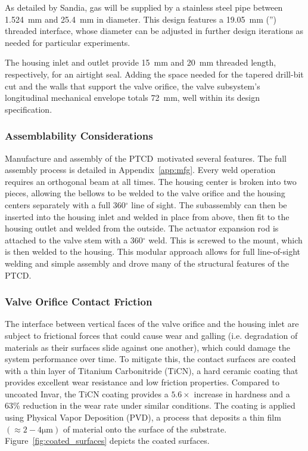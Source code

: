 \documentclass[12pt, letterpaper]{report}%
\newcounter{mycounter}           %
\newcounter{sub}[mycounter]      %
\newcommand{\device}{PTCD}
\begin{document}
				As detailed by Sandia, gas will be supplied by a stainless steel pipe between \SI{1.524}{\milli\meter} and \SI{25.4}{\milli\meter} in diameter.
				This design features a \SI{19.05}{\milli\meter} ('') threaded interface, whose diameter can be adjusted in further design iterations as needed for particular experiments.

				The housing inlet and outlet provide \SI{15}{\milli\meter} and \SI{20}{\milli\meter} threaded length, respectively, for an airtight seal.
				Adding the space needed for the tapered drill-bit cut and the walls that support the valve orifice, the valve subsystem's longitudinal mechanical envelope totals \SI{72}{\milli\meter}, well within its design specification.

				\subsubsection{Assemblability Considerations}
			\label{subsubsec:design:just:gen_dim:assem}

				Manufacture and assembly of the \device\ motivated several features. The full assembly process is detailed in Appendix~\ref{app:mfg}.
				Every weld operation requires an orthogonal beam at all times.
				The housing center is broken into two pieces, allowing the bellows to be welded to the valve orifice and the housing centers separately with a full 360$^\circ$ line of sight.
				The subassembly can then be inserted into the housing inlet and welded in place from above, then fit to the housing outlet and welded from the outside.
				The actuator expansion rod is attached to the valve stem with a 360$^\circ$ weld.
				This is screwed to the mount, which is then welded to the housing.
				This modular approach allows for full line-of-sight welding and simple assembly and drove many of the structural features of the \device.

			\subsubsection{Valve Orifice Contact Friction}
			\label{subsubsec:design:just:gen_dim:friction}

			The interface between vertical faces of the valve orifice and the housing inlet are subject to frictional forces that could cause wear and galling (i.e. degradation of materials as their surfaces slide against one another), which could damage the system performance over time.
			To mitigate this, the contact surfaces are coated with a thin layer of Titanium Carbonitride (TiCN), a hard ceramic coating that provides excellent wear resistance and low friction properties.
			Compared to uncoated Invar, the TiCN coating provides a $5.6\!\times\!$ increase in hardness and a 63\% reduction in the wear rate under similar conditions\cite{ref_TiCN_Coating}.
			The coating is applied using Physical Vapor Deposition (PVD), a process that deposits a thin film $(\approx 2-4 \si{\micro\meter})$ of material onto the surface of the substrate.
			Figure~\ref{fig:coated_surfaces} depicts the coated surfaces.
			
\end{document}
